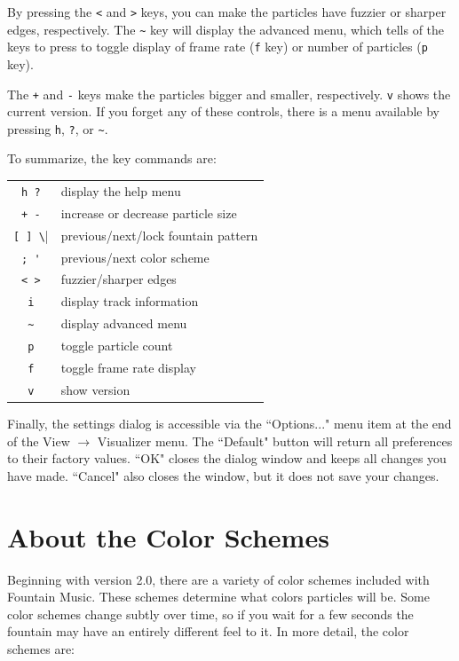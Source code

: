 \documentclass[11pt]{article}
\begin{document}
By pressing the \verb|<| and \verb|>| keys, you can make the particles have fuzzier or sharper edges, respectively.  The \verb|~| key will display the advanced menu, which tells of the keys to press to toggle display of frame rate (\verb|f| key) or number of particles (\verb|p| key).

The \verb|+| and \verb|-| keys make the particles bigger and smaller, respectively. \verb|v| shows the current version.  If you forget any of these controls, there is a menu available by pressing \verb|h|, \verb|?|, or \verb|~|.

To summarize, the key commands are:

\begin{tabular}{c|l}
\verb|h ?| & 	display the help menu                    \\
\verb|+ -| &  	increase or decrease particle size       \\
\verb|[ ] \|&  	previous/next/lock fountain pattern  \\
\verb|; '| &  previous/next color scheme                \\
\verb|< >| &  fuzzier/sharper edges                     \\
\verb|i|   & display track information                  \\
\verb|~|   & display advanced menu                      \\
\verb|p|   & toggle particle count                      \\
\verb|f|   & toggle frame rate display                  \\
\verb|v|   & show version                               
\end{tabular}

Finally, the settings dialog is accessible via the ``Options..." menu item at the end of the View $\rightarrow$ Visualizer menu.  The ``Default" button will return all preferences to their factory values. ``OK" closes the dialog window and keeps all changes you have made. ``Cancel" also closes the window, but it does not save your changes.

\section*{About the Color Schemes}
Beginning with version 2.0, there are a variety of color schemes included with Fountain Music.  These schemes determine what colors particles will be.  Some color schemes change subtly over time, so if you wait for a few seconds the fountain may have an entirely different feel to it. In more detail, the color schemes are:
\end{document}
